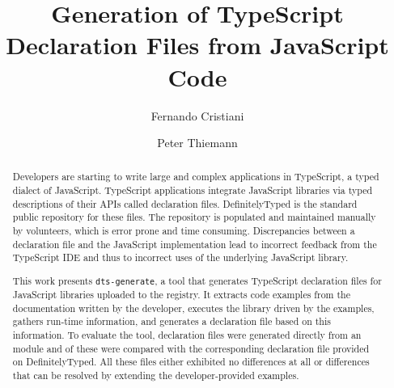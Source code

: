 \documentclass[sigconf]{acmart}
\begin{document}
\title{Generation of TypeScript Declaration Files from JavaScript Code}


\author{Fernando Cristiani}

\author{Peter Thiemann}



\begin{abstract}
  Developers are starting to write large and complex applications in
  TypeScript, a typed dialect of JavaScript. TypeScript applications
  integrate JavaScript libraries via typed descriptions of their APIs
  called declaration files. DefinitelyTyped is the standard public
  repository for these files.
  The repository is populated and maintained manually by volunteers, which
  is error prone and time consuming. Discrepancies between a
  declaration file and the JavaScript implementation lead to
  incorrect feedback from the TypeScript IDE and thus to incorrect uses
  of the underlying JavaScript library.

  This work presents \texttt{dts-generate}, a tool that generates
  TypeScript declaration files for JavaScript libraries uploaded to the \NPM{}
  registry. It extracts code examples from the documentation written by
  the developer, executes the library driven by the examples, gathers
  run-time information, and generates a declaration file based on this
  information. To evaluate the tool, \CountModulesGeneratedDeclarationFile{} declaration files were
  generated directly from an \NPM{} module and \CountModulesOnlySolvableDifferences{} of these were
  compared with the corresponding declaration file provided on
  DefinitelyTyped.  All these files either
  exhibited no differences at all or differences that can be resolved by
  extending the developer-provided examples.
\end{abstract}
\end{document}
